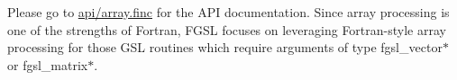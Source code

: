 Please go to \hyperlink{array_8finc}{api/array.\-finc} for the A\-P\-I documentation. Since array processing is one of the strengths of Fortran, F\-G\-S\-L focuses on leveraging Fortran-\/style array processing for those G\-S\-L routines which require arguments of type {\ttfamily fgsl\-\_\-vector$\ast$} or {\ttfamily fgsl\-\_\-matrix$\ast$}. 